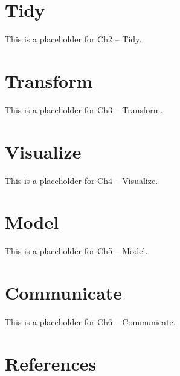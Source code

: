 \documentclass[
  letterpaper,
  DIV=11,
  numbers=noendperiod]{scrreprt}
\begin{document}

\chapter{Tidy}\label{tidy}

This is a placeholder for Ch2 -- Tidy.


\chapter{Transform}\label{transform}

This is a placeholder for Ch3 -- Transform.


\chapter{Visualize}\label{visualize}

This is a placeholder for Ch4 -- Visualize.


\chapter{Model}\label{model}

This is a placeholder for Ch5 -- Model.


\chapter{Communicate}\label{communicate}

This is a placeholder for Ch6 -- Communicate.


\chapter*{References}\label{references}

\end{document}
